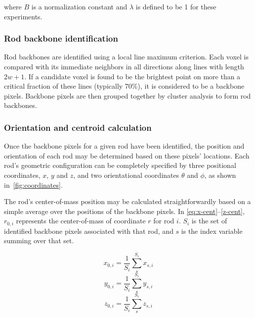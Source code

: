 where $B$ is a normalization constant and $\lambda$ is defined to be 1 for these experiments.

\subsubsection{Rod backbone identification}


Rod backbones are identified using a local line maximum criterion.  Each voxel is compared with its immediate 
neighbors in all directions along lines with length $2w+1$.  If a candidate voxel is found to be the brightest
point on more than a critical fraction of these lines (typically 70\%), it is considered to be a backbone
pixels.  Backbone pixels are then grouped together by cluster analysis to form rod backbones.


\subsubsection{Orientation and centroid calculation}
\label{sec:orient-calculate}


Once the backbone pixels for a given rod have been identified, the position and orientation of each rod may
be determined based on these pixels' locations.  Each rod's geometric configuration can be
completely specified by three positional coordinates, $x$, $y$ and $z$, and two
orientational coordinates $\theta$ and $\phi$, as shown in~\ref{fig:coordinates}.

The rod's center-of-mass position may be calculated
straightforwardly based on a simple average over the positions of the backbone pixels.  In 
\ref{eq:x-cent}--\ref{z-cent}, $r_{0,i}$ represents the center-of-mass of coordinate $r$ for 
rod $i$.  $S_i$ is the set of identified backbone pixels associated with that rod, and $s$ is the index
variable summing over that set.

\begin{equation}
\label{eq:x-cent}
x_{0,i} = \frac{1}{S_i} \sum_{s}^{S_i} x_{s,i}
\end{equation}
\begin{equation}
\label{eq:y-cent}
y_{0,i} = \frac{1}{S_i} \sum_{s}^{S_i} y_{s,i}
\end{equation}
\begin{equation}
\label{eq:z-cent}
z_{0,i} = \frac{1}{S_i} \sum_{s}^{S_i} z_{s,i} 
\end{equation}

